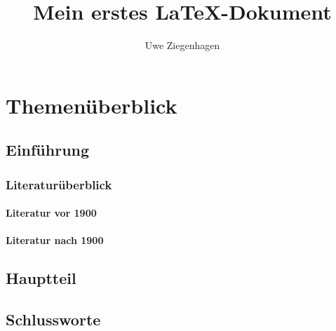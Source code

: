 \documentclass[12pt,ngerman,parskip=half]{scrreprt}
\author{Uwe Ziegenhagen}
\title{Mein erstes \LaTeX-Dokument}
\begin{document}
\maketitle

\tableofcontents

\chapter{Themenüberblick}

\section{Einführung}
\subsection{Literaturüberblick}
\subsubsection{Literatur vor 1900}

\blindtext

\blindtext

\blindtext

\subsubsection{Literatur nach 1900}

\blindtext

\blindtext

\blindtext

\section{Hauptteil}

\blindtext[100]


\section{Schlussworte}

\blindtext[10]
\end{document}
